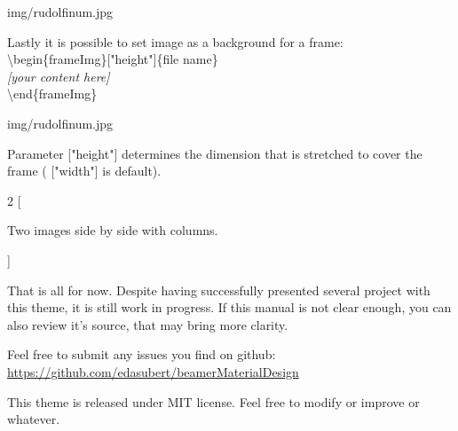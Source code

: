 \documentclass[aspectratio=43]{beamer}
\begin{document}
\begin{frameImg}{img/rudolfinum.jpg}
\vspace*{60mm}
\begin{cardTiny}
Lastly it is possible to set image as a background for a frame:\\[2mm]
{\color{primary} \textbackslash begin\{frameImg\}["height"]\{file name\}\\[2mm]}
\null\qquad \textit{[your content here]}\\[2mm]
{\color{primary} \textbackslash end\{frameImg\}}
\end{cardTiny}
\end{frameImg}

\begin{frameImg}[height]{img/rudolfinum.jpg}
\vspace*{60mm}
\begin{cardTiny}
Parameter {\color{primary} ["height"]} determines the dimension that is stretched to cover the frame ({\color{primary} ["width"]} is default).
\end{cardTiny}
\end{frameImg}

\begin{frame}
\begin{multicols}{2}
[
\begin{cardTiny}
Two images side by side with columns.
\end{cardTiny}
]
\centering
{}

\end{multicols}
\end{frame}

\begin{frame}
\begin{card}
That is all for now. Despite having successfully presented several project with this theme, it is still work in progress. If this manual is not clear enough, you can also review it's source, that may bring more clarity.
\end{card}
\begin{card}
Feel free to submit any issues you find on github: \\
{\footnotesize \url{https://github.com/edasubert/beamerMaterialDesign}}
\end{card}
\begin{card}
This theme is released under MIT license. Feel free to modify or improve or whatever. 
\end{card}
\end{frame}
\end{document}
